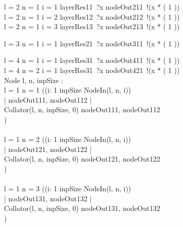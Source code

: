 \documentclass{article}
\begin{document}
\begin{figure}[p]
\begin{circus}
      \lcircguard l = 2 \land n = 1 \land i = 1 \rcircguard \circguard layerRes11~?x \then nodeOut211~!(x * ( 1 )) \then \Skip \\%
      \extchoice
      \lcircguard l = 2 \land n = 1 \land i = 2 \rcircguard \circguard layerRes12~?x \then nodeOut212~!(x * ( 1 )) \then \Skip \\%
      \extchoice
      \lcircguard l = 2 \land n = 1 \land i = 3 \rcircguard \circguard layerRes13~?x \then nodeOut213~!(x * ( 1 )) \then \Skip \\%
      \extchoice
      
      \lcircguard l = 3 \land n = 1 \land i = 1 \rcircguard \circguard layerRes21~?x \then nodeOut311~!(x * ( 1 )) \then \Skip \\%
      \extchoice
      
      \lcircguard l = 4 \land n = 1 \land i = 1 \rcircguard \circguard layerRes31~?x \then nodeOut411~!(x * ( 1 )) \then \Skip \\%
      \extchoice
      \lcircguard l = 4 \land n = 2 \land i = 1 \rcircguard \circguard layerRes31~?x \then nodeOut421~!(x * ( 1 )) \then \Skip \\%
      
    
      Node \circdef l, n, inpSize : \nat \circspot \\%
        \lcircguard l = 1 \land n = 1 \rcircguard \circguard
        ((\Interleave i: 1 \upto inpSize \circspot NodeIn(l, n, i)) \\%
        \lpar | \lchanset nodeOut111, nodeOut112 \rchanset | \rpar \\%
        Collator(l, n, inpSize, 0) \circhide \lchanset nodeOut111, nodeOut112 \rchanset \\   
        ) \\
        \extchoice \\
        
        \lcircguard l = 1 \land n = 2 \rcircguard \circguard
        ((\Interleave i: 1 \upto inpSize \circspot NodeIn(l, n, i)) \\%
        \lpar | \lchanset nodeOut121, nodeOut122 \rchanset | \rpar \\%
        Collator(l, n, inpSize, 0) \circhide \lchanset nodeOut121, nodeOut122 \rchanset \\   
        ) \\
        \extchoice \\
        
        \lcircguard l = 1 \land n = 3 \rcircguard \circguard
        ((\Interleave i: 1 \upto inpSize \circspot NodeIn(l, n, i)) \\%
        \lpar | \lchanset nodeOut131, nodeOut132 \rchanset | \rpar \\%
        Collator(l, n, inpSize, 0) \circhide \lchanset nodeOut131, nodeOut132 \rchanset \\   
        ) \\
        \extchoice \\
        

\end{circus}
\end{figure}
\end{document}
